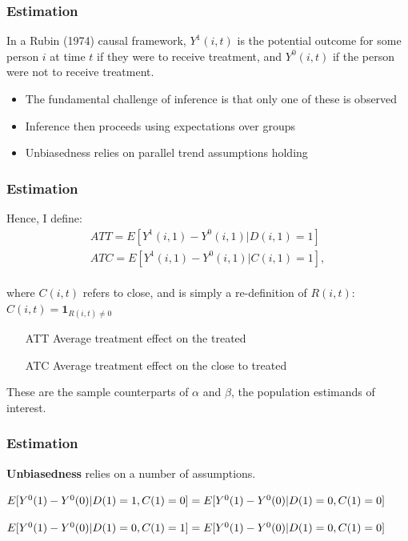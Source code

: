 \documentclass[10pt,letterpaper,subeqn]{beamer}
\begin{document}
\begin{frame}[label=estim2]
  \frametitle{Estimation}
In a Rubin (1974) causal framework, $Y^1(i,t)$ is the potential outcome for some 
person $i$ at time $t$ if they were to receive treatment, and $Y^0(i,t)$ if the 
person were not to receive treatment.
\vspace{4mm}
\begin{itemize}
\item The fundamental challenge of inference is that only one of these is observed
\item Inference then proceeds using expectations over groups
\item Unbiasedness relies on parallel trend assumptions holding
\end{itemize}
\end{frame}

\begin{frame}[label=estim3]
  \frametitle{Estimation}
Hence, I define:
\vspace{4mm}
\begin{eqnarray}
\label{Seqn:estimATT}
ATT=E[Y^1(i,1)-Y^0(i,1)|D(i,1)=1]\  \\
\label{Seqn:estimATC}
ATC=E[Y^1(i,1)-Y^0(i,1)|C(i,1)=1],
\end{eqnarray}
\vspace{4mm} \\
where $C(i,t)$ refers to close, and is simply a re-definition of $R(i,t)$:
$C(i,t)=\mathbf{1}_{R(i,t)\neq 0}$
\vspace{4mm} \\
\begin{enumerate}
\item[ATT] Average treatment effect on the treated
\item[ATC] Average treatment effect on the close to treated
\end{enumerate}
These are the sample counterparts of $\alpha$ and $\beta$, the population 
estimands of interest.

\end{frame}



\begin{frame}[label=estim4]
  \frametitle{Estimation}
\textbf{Unbiasedness} relies on a number of assumptions. \\
\vspace{5mm}

\begin{tcolorbox}[title =1. Parallel trends in treatment and control]
$E[Y^0(1)-Y^0(0)|D(1)=1,C(1)=0]= \\
E[Y^0(1)-Y^0(0)|D(1)=0,C(1)=0]$
\end{tcolorbox}

\begin{tcolorbox}[title =2. Parallel trends in close and control]
$E[Y^0(1)-Y^0(0)|D(1)=0,C(1)=1]= \\
E[Y^0(1)-Y^0(0)|D(1)=0,C(1)=0]$
\end{tcolorbox}

\end{frame}
\end{document}
